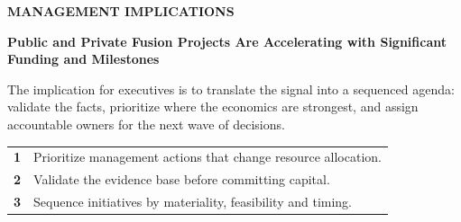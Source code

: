 \documentclass[10pt,a4paper]{article}
\begin{document}
\clearpage
{\textcolor{BOBlue}{\scriptsize\bfseries MANAGEMENT IMPLICATIONS}}\par\vspace{-1pt}
{\Large\sffamily\bfseries\color{BONavy} Public and Private Fusion Projects Are Accelerating with Significant Funding and Milestones}\par\vspace{4pt}
{\small The implication for executives is to translate the signal into a sequenced agenda: validate the facts, prioritize where the economics are strongest, and assign accountable owners for the next wave of decisions.}\par
\begin{tabularx}{\linewidth}{p{10mm}Y}
\textcolor{BOBlue}{\bfseries 1} & Prioritize management actions that change resource allocation. \\[5pt]
\textcolor{BOBlue}{\bfseries 2} & Validate the evidence base before committing capital. \\[5pt]
\textcolor{BOBlue}{\bfseries 3} & Sequence initiatives by materiality, feasibility and timing. \\[5pt]
\end{tabularx}
\vspace{6pt}

\vspace{6pt}{\textcolor{BOBlue}{\scriptsize\bfseries EXECUTION ROADMAP}}\par
\begin{center}
\end{center}
\end{document}
